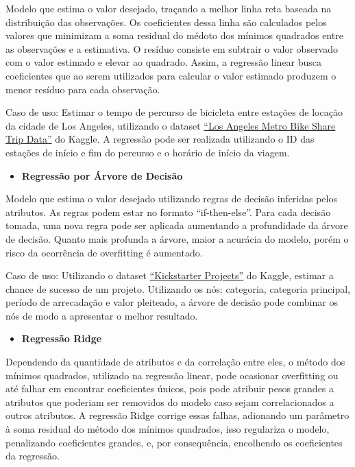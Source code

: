 \documentclass[11pt]{article}
\providecommand{\tightlist}{%
      \setlength{\itemsep}{0pt}\setlength{\parskip}{0pt}}
\begin{document}
Modelo que estima o valor desejado, traçando a melhor linha reta baseada
na distribuição das observações. Os coeficientes dessa linha são
calculados pelos valores que minimizam a soma residual do médoto dos
mínimos quadrados entre as observações e a estimativa. O resíduo
consiste em subtrair o valor observado com o valor estimado e elevar ao
quadrado. Assim, a regressão linear busca coeficientes que ao serem
utilizados para calcular o valor estimado produzem o menor resíduo para
cada observação.

Caso de uso: Estimar o tempo de percurso de bicicleta entre estações de
locação da cidade de Los Angeles, utilizando o dataset
\href{https://www.kaggle.com/cityofLA/los-angeles-metro-bike-share-trip-data}{``Los
Angeles Metro Bike Share Trip Data''} do Kaggle. A regressão pode ser
realizada utilizando o ID das estações de início e fim do percurso e o
horário de início da viagem.

\begin{itemize}
\tightlist
\item
  \textbf{Regressão por Árvore de Decisão}
\end{itemize}

Modelo que estima o valor desejado utilizando regras de decisão
inferidas pelos atributos. As regras podem estar no formato
``if-then-else''. Para cada decisão tomada, uma nova regra pode ser
aplicada aumentando a profundidade da árvore de decisão. Quanto mais
profunda a árvore, maior a acurácia do modelo, porém o risco da
ocorrência de overfitting é aumentado.

Caso de uso: Utilizando o dataset
\href{https://www.kaggle.com/kemical/kickstarter-projects}{``Kickstarter
Projects''} do Kaggle, estimar a chance de sucesso de um projeto.
Utilizando os nós: categoria, categoria principal, período de
arrecadação e valor pleiteado, a árvore de decisão pode combinar os nós
de modo a apresentar o melhor resultado.

\begin{itemize}
\tightlist
\item
  \textbf{Regressão Ridge}
\end{itemize}

Dependendo da quantidade de atributos e da correlação entre eles, o
método dos mínimos quadrados, utilizado na regressão linear, pode
ocasionar overfitting ou até falhar em encontrar coeficientes únicos,
pois pode atribuir pesos grandes a atributos que poderiam ser removidos
do modelo caso sejam correlacionados a outros atributos. A regressão
Ridge corrige essas falhas, adionando um parâmetro à soma residual do
método dos mínimos quadrados, isso regulariza o modelo, penalizando
coeficientes grandes, e, por consequência, encolhendo os coeficientes da
regressão.
\end{document}
